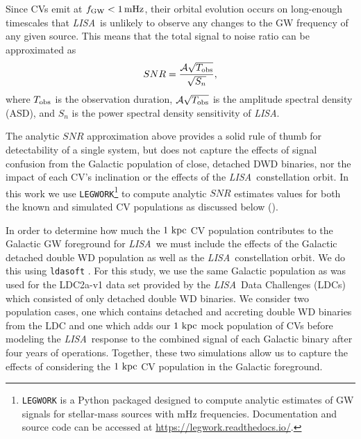 \documentclass[fleqn,usenatbib]{mnras}
\newcommand{\lisa}{{\it LISA}}
\newcommand{\kb}[1]{[\textcolor{teal}{KB: #1}]}
\begin{document}
Since CVs emit at $f_{\rm{GW}} < 1\,\rm{mHz}$, their orbital evolution occurs on long-enough timescales that \lisa\ is unlikely to observe any changes to the GW frequency of any given source. This means that the total signal to noise ratio can be approximated as
\begin{equation}\label{eq:SNR}
       SNR = \frac{\mathcal{A}\sqrt{T_{\rm{obs}}}}{\sqrt{S_n}},
\end{equation}
\noindent where $T_{\rm{obs}}$ is the observation duration, $\mathcal{A}\sqrt{T_{\rm{obs}}}$ is the amplitude spectral density (ASD), and $S_n$ is the power spectral density sensitivity of \lisa. 

The analytic $SNR$ approximation above provides a solid rule of thumb for detectability of a single system, but does not capture the effects of signal confusion from the Galactic population of close, detached DWD binaries, nor the impact of each CV's inclination or the effects of the \lisa\ constellation orbit. In this work we use \texttt{LEGWORK}\footnote{\texttt{LEGWORK} is a Python packaged designed to compute analytic estimates of GW signals for stellar-mass sources with mHz frequencies. Documentation and source code can be accessed at \href{https://legwork.readthedocs.io/}{https://legwork.readthedocs.io/}.} to compute analytic $SNR$ estimates values for both the known and simulated CV populations as discussed below (\citealt{LEGWORK_joss,LEGWORK_apjs}). 


In order to determine how much the $1~\rm{kpc}$ CV population contributes to the Galactic GW foreground for \lisa\, we must include the effects of the Galactic detached double WD population as well as the \lisa\ constellation orbit. We do this using \texttt{ldasoft} \citep{ldasoft}. For this study, we use the same Galactic population as was used for the LDC2a-v1 data set provided by the \lisa\ Data Challenges (LDCs)~\citep{le_jeune_maude_2022_7132178} which consisted of only detached double WD binaries.  We consider two population cases, one which contains detached and accreting double WD binaries from the LDC and one which adds our $1~\rm{kpc}$ mock population of CVs before modeling the \lisa\ response to the combined signal of each Galactic binary after four years of operations. Together, these two simulations allow us to capture the effects of considering the $1~\rm{kpc}$ CV population in the Galactic foreground. 
\end{document}
